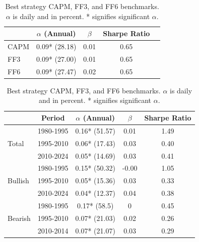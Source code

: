 \documentclass{article}
\begin{document}
\begin{table}[h]
    \centering
    \begin{minipage}{0.4\textwidth}
        \centering
        \begin{tabular}{lcccc}
            \toprule
            & $\alpha$ (Annual) & $\beta$ & Sharpe Ratio \\
            \midrule
            CAPM & 0.09* (28.18) & 0.01 & 0.65 \\
            FF3  & 0.09* (27.00) & 0.01 & 0.65 \\
            FF6  & 0.09* (27.47) & 0.02 & 0.65 \\
            \bottomrule
        \end{tabular}
        \caption{Best strategy CAPM, FF3, and FF6 benchmarks. $\alpha$ is daily and in percent. * signifies significant $\alpha$.}
        \label{tab:benchmarks}
    \end{minipage}
    \hspace{0.05\textwidth} %
    \begin{minipage}{0.4\textwidth}
        \centering
        \begin{tabular}{lcccc}
            \toprule
             & Period & $\alpha$ (Annual) & $\beta$ & Sharpe Ratio \\
            \midrule
            \multirow{3}{*}{Total} & 1980-1995 & 0.16* (51.57) & 0.01 & 1.49 \\
                                   & 1995-2010 & 0.06* (17.43) & 0.03 & 0.40 \\
                                   & 2010-2024 & 0.05* (14.69) & 0.03 & 0.41 \\
            \midrule
            \multirow{3}{*}{Bullish} & 1980-1995 & 0.15* (50.32) & -0.00 & 1.05 \\
                                     & 1995-2010 & 0.05* (15.36) & 0.03 & 0.33 \\
                                     & 2010-2024 & 0.04* (12.37) & 0.04 & 0.38 \\
            \midrule
            \multirow{3}{*}{Bearish} & 1980-1995 & 0.17* (58.5) & 0 & 0.45 \\
                                     & 1995-2010 & 0.07* (21.03) & 0.02 & 0.26 \\
                                     & 2010-2014 & 0.07* (21.07) & 0.03 & 0.29 \\
            \bottomrule
        \end{tabular}
    \end{minipage}
\end{table}
\end{document}
